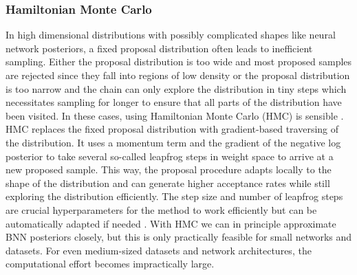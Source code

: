 \documentclass[../thesis.tex]{subfiles}
\begin{document}
\subsubsection*{Hamiltonian Monte Carlo}
In high dimensional distributions with possibly complicated shapes like neural network posteriors, a fixed proposal distribution often leads to inefficient sampling. Either the proposal distribution is too wide and most proposed samples are rejected since they fall into regions of low density or the proposal distribution is too narrow and the chain can only explore the distribution in tiny steps which necessitates sampling for longer to ensure that all parts of the distribution have been visited. In these cases, using Hamiltonian Monte Carlo (HMC) is sensible \parencite{duane1987hybrid, neal1995bayesian}. HMC replaces the fixed proposal distribution with gradient-based traversing of the distribution. It uses a momentum term and the gradient of the negative log posterior to take several so-called leapfrog steps in weight space to arrive at a new proposed sample. This way, the proposal procedure adapts locally to the shape of the distribution and can generate higher acceptance rates while still exploring the distribution efficiently. The step size and number of leapfrog steps are crucial hyperparameters for the method to work efficiently but can be automatically adapted if needed \parencite{hoffman2014no}.  With HMC we can in principle approximate BNN posteriors closely, but this is only practically feasible for small networks and datasets. For even medium-sized datasets and network architectures, the computational effort becomes impractically large.
\end{document}
